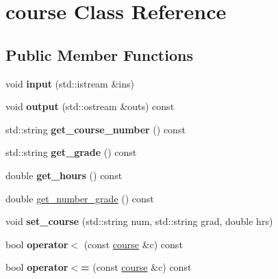 \hypertarget{classcourse}{}\section{course Class Reference}
\label{classcourse}
\subsection*{Public Member Functions}
\begin{DoxyCompactItemize}
\item 
void {\bfseries input} (std\+::istream \&ins)\hypertarget{classcourse_a0a8839f2369903101399bca60547aed2}{}\label{classcourse_a0a8839f2369903101399bca60547aed2}

\item 
void {\bfseries output} (std\+::ostream \&outs) const \hypertarget{classcourse_adf8ca7160e06644424027332c733242a}{}\label{classcourse_adf8ca7160e06644424027332c733242a}

\item 
std\+::string {\bfseries get\+\_\+course\+\_\+number} () const \hypertarget{classcourse_af8bc5c1d6f03de72f643a3011428b979}{}\label{classcourse_af8bc5c1d6f03de72f643a3011428b979}

\item 
std\+::string {\bfseries get\+\_\+grade} () const \hypertarget{classcourse_a1ac5854ce76435b9f286d814e16f27bc}{}\label{classcourse_a1ac5854ce76435b9f286d814e16f27bc}

\item 
double {\bfseries get\+\_\+hours} () const \hypertarget{classcourse_a8a2b5572f9d13e3cb3fd054b66bc70ac}{}\label{classcourse_a8a2b5572f9d13e3cb3fd054b66bc70ac}

\item 
double \hyperlink{classcourse_a525d1dd085d0a9f77f861ec5f0b04f6c}{get\+\_\+number\+\_\+grade} () const 
\item 
void {\bfseries set\+\_\+course} (std\+::string num, std\+::string grad, double hrs)\hypertarget{classcourse_a1fce1a16efb3f07d0da5daca8005e4a6}{}\label{classcourse_a1fce1a16efb3f07d0da5daca8005e4a6}

\item 
bool {\bfseries operator$<$} (const \hyperlink{classcourse}{course} \&c) const \hypertarget{classcourse_a1666b9203d42b2cda999d52c3fbcd342}{}\label{classcourse_a1666b9203d42b2cda999d52c3fbcd342}

\item 
bool {\bfseries operator$<$=} (const \hyperlink{classcourse}{course} \&c) const \hypertarget{classcourse_a6416d3083ef57cca7ed77f260f48dc11}{}\label{classcourse_a6416d3083ef57cca7ed77f260f48dc11}


\end{DoxyCompactItemize}
